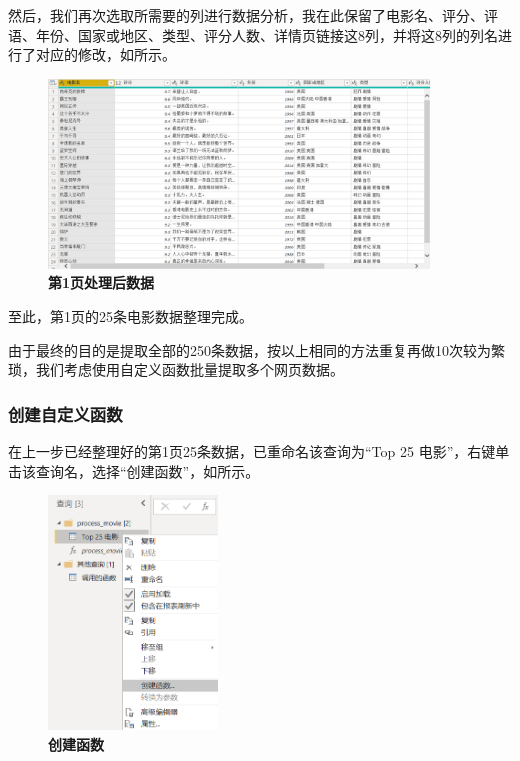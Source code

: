 然后，我们再次选取所需要的列进行数据分析，我在此保留了电影名、评分、评语、年份、国家或地区、类型、评分人数、详情页链接这8列，并将这8列的列名进行了对应的修改，如所示。

\begin{figure}[htbp]
    \centering
    \includegraphics[width=0.9\textwidth]{figure/PowerBI/douban_first_page_processed.png}
    \caption{\textbf{第1页处理后数据}}
    \label{fig:douban_first_page_processed}
\end{figure}

至此，第1页的25条电影数据整理完成。

由于最终的目的是提取全部的250条数据，按以上相同的方法重复再做10次较为繁琐，我们考虑使用自定义函数批量提取多个网页数据。

\subsubsection{创建自定义函数}

在上一步已经整理好的第1页25条数据，已重命名该查询为``Top 25 电影''，右键单击该查询名，选择``创建函数''，如所示。

\begin{figure}[htbp]
    \centering
    \includegraphics[width=0.4\textwidth]{figure/PowerBI/douban_create_func.png}
    \caption{\textbf{创建函数}}
    \label{fig:douban_create_func}
\end{figure}

